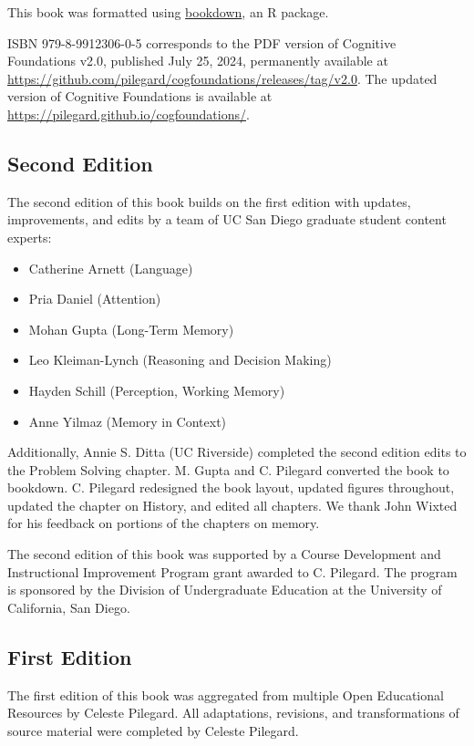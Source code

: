 \documentclass[
]{krantz}
\providecommand{\tightlist}{%
  \setlength{\itemsep}{0pt}\setlength{\parskip}{0pt}}
\begin{document}
This book was formatted using \href{https://bookdown.org/}{bookdown}, an R package.

ISBN 979-8-9912306-0-5 corresponds to the PDF version of Cognitive Foundations v2.0, published July 25, 2024, permanently available at \url{https://github.com/pilegard/cogfoundations/releases/tag/v2.0}. The updated version of Cognitive Foundations is available at \url{https://pilegard.github.io/cogfoundations/}.

\subsection*{Second Edition}\label{second-edition}


The second edition of this book builds on the first edition with updates, improvements, and edits by a team of UC San Diego graduate student content experts:

\begin{itemize}
\tightlist
\item
  Catherine Arnett (Language)
\item
  Pria Daniel (Attention)
\item
  Mohan Gupta (Long-Term Memory)
\item
  Leo Kleiman-Lynch (Reasoning and Decision Making)
\item
  Hayden Schill (Perception, Working Memory)
\item
  Anne Yilmaz (Memory in Context)
\end{itemize}

Additionally, Annie S. Ditta (UC Riverside) completed the second edition edits to the Problem Solving chapter. M. Gupta and C. Pilegard converted the book to bookdown. C. Pilegard redesigned the book layout, updated figures throughout, updated the chapter on History, and edited all chapters. We thank John Wixted for his feedback on portions of the chapters on memory.

The second edition of this book was supported by a Course Development and Instructional Improvement Program grant awarded to C. Pilegard. The program is sponsored by the Division of Undergraduate Education at the University of California, San Diego.

\subsection*{First Edition}\label{first-edition}


The first edition of this book was aggregated from multiple Open Educational Resources by Celeste Pilegard. All adaptations, revisions, and transformations of source material were completed by Celeste Pilegard.
\end{document}
